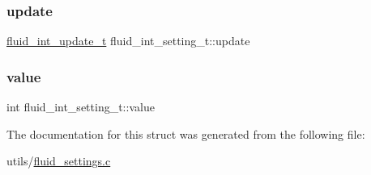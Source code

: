 \mbox{\label{structfluid__int__setting__t_af92c12c973bd9cf3aa18d6cfa1120081}} 
\subsubsection{\texorpdfstring{update}{update}}
{\footnotesize\ttfamily \hyperlink{fluid__settings_8h_a587ba97e58a30be87d4ce53367f891f5}{fluid\+\_\+int\+\_\+update\+\_\+t} fluid\+\_\+int\+\_\+setting\+\_\+t\+::update}

\mbox{\label{structfluid__int__setting__t_a1adf9449feb77990049e6ec53bc372d4}} 
\subsubsection{\texorpdfstring{value}{value}}
{\footnotesize\ttfamily int fluid\+\_\+int\+\_\+setting\+\_\+t\+::value}



The documentation for this struct was generated from the following file\+:\begin{DoxyCompactItemize}
\item 
utils/\hyperlink{fluid__settings_8c}{fluid\+\_\+settings.\+c}\end{DoxyCompactItemize}
